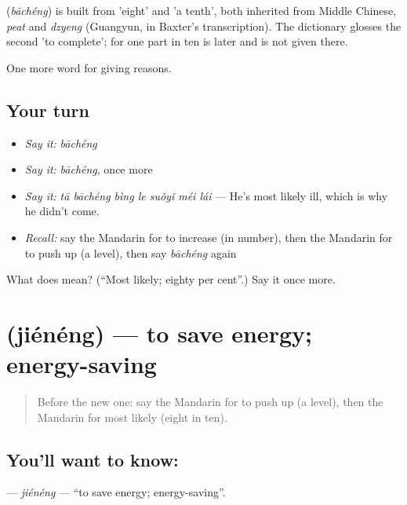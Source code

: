 \begin{cousinweb}
\textbf{} (\emph{bāchéng}) is built from  'eight' and  'a tenth', both inherited from Middle Chinese, \emph{peat} and \emph{dzyeng} (Guangyun, in Baxter's transcription). The dictionary glosses the second 'to complete';  for one part in ten is later and is not given there.
\end{cousinweb}

\begin{grammarlens}[title={What you've built}]
One more word for giving reasons.
\end{grammarlens}

\subsection*{Your turn}
\begin{itemize}
\raggedright
  \item \emph{Say it:} \emph{bāchéng}
  \item \emph{Say it:} \emph{bāchéng}, once more
  \item \emph{Say it:} \emph{tā bāchéng bìng le suǒyǐ méi lái} — He's most likely ill, which is why he didn't come.
  \item \emph{Recall:} say the Mandarin for to increase (in number), then the Mandarin for to push up (a level), then say \emph{bāchéng} again
\end{itemize}

\begin{tcolorbox}[breakable,colback=teal!4,colframe=teal!35!black,title={Before you move on}]
What does  mean? (\textquotedblleft{}Most likely; eighty per cent\textquotedblright{}.) Say it once more.
\end{tcolorbox}
\section[\texorpdfstring{\zh{节能} (jiénéng)}{节能 (jiénéng)}]{ (jiénéng) — to save energy; energy-saving}

\label{lesson:ZH-C385-jieneng}



\begin{quote}
Before the new one: say the Mandarin for to push up (a level), then the Mandarin for most likely (eight in ten).
\end{quote}

\subsection*{You'll want to know: }
\textbf{} — \emph{jiénéng} — \textquotedblleft{}to save energy; energy-saving\textquotedblright{}.


